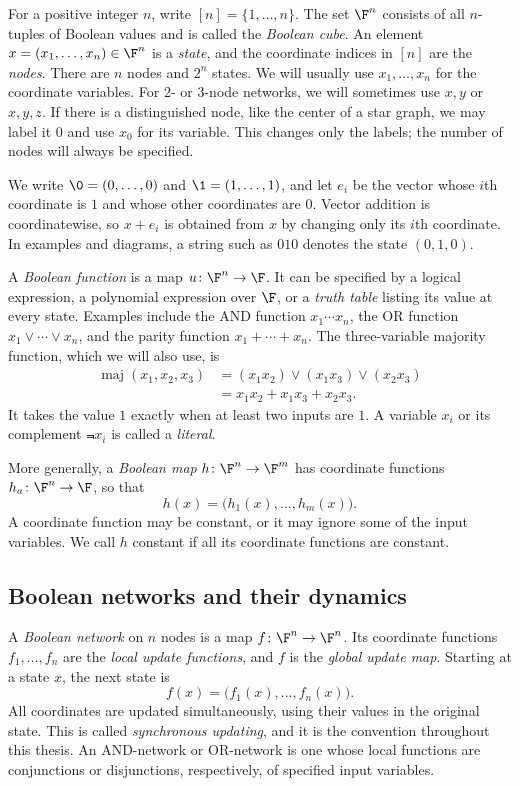 For a positive integer $n$, write $[n]=\{1,\dots,n\}$. The set $\F^n$ consists of all $n$-tuples of Boolean values and is called the \emph{Boolean cube}. An element $x=(x_1,\dots,x_n)\in\F^n$ is a \emph{state}, and the coordinate indices in $[n]$ are the \emph{nodes}. There are $n$ nodes and $2^n$ states. We will usually use $x_1,\dots,x_n$ for the coordinate variables. For $2$- or $3$-node networks, we will sometimes use $x,y$ or $x,y,z$. If there is a distinguished node, like the center of a star graph, we may label it $0$ and use $x_0$ for its variable. This changes only the labels; the number of nodes will always be specified.

We write $\0=(0,\dots,0)$ and $\1=(1,\dots,1)$, and let $e_i$ be the vector whose $i$th coordinate is $1$ and whose other coordinates are $0$. Vector addition is coordinatewise, so $x+e_i$ is obtained from $x$ by changing only its $i$th coordinate. In examples and diagrams, a string such as $010$ denotes the state $(0,1,0)$.

A \emph{Boolean function} is a map $u\colon\F^n\to\F$. It can be specified by a logical expression, a polynomial expression over $\F$, or a \emph{truth table} listing its value at every state. Examples include the AND function $x_1\cdots x_n$, the OR function $x_1\vee\cdots\vee x_n$, and the parity function $x_1+\cdots+x_n$. The three-variable majority function, which we will also use, is
\begin{align*}
    \operatorname{maj}(x_1,x_2,x_3)
    &=(x_1x_2)\vee(x_1x_3)\vee(x_2x_3)\\
    &=x_1x_2+x_1x_3+x_2x_3.
\end{align*}
It takes the value $1$ exactly when at least two inputs are $1$. A variable $x_i$ or its complement $\Not{x}_i$ is called a \emph{literal}.

More generally, a \emph{Boolean map} $h\colon\F^n\to\F^m$ has coordinate functions $h_a\colon\F^n\to\F$, so that
\[
    h(x)=\bigl(h_1(x),\dots,h_m(x)\bigr).
\]
A coordinate function may be constant, or it may ignore some of the input variables. We call $h$ constant if all its coordinate functions are constant.

\subsection{Boolean networks and their dynamics}

A \emph{Boolean network} on $n$ nodes is a map $f\colon\F^n\to\F^n$. Its coordinate functions $f_1,\dots,f_n$ are the \emph{local update functions}, and $f$ is the \emph{global update map}. Starting at a state $x$, the next state is
\[
    f(x)=\bigl(f_1(x),\dots,f_n(x)\bigr).
\]
All coordinates are updated simultaneously, using their values in the original state. This is called \emph{synchronous updating}, and it is the convention throughout this thesis. An AND-network or OR-network is one whose local functions are conjunctions or disjunctions, respectively, of specified input variables.

